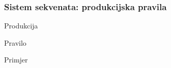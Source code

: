 \documentclass{beamer}
\begin{document}
\begin{frame}
  \frametitle{Sistem sekvenata: produkcijska pravila}
  \begin{block}{Produkcija}
    \begin{prooftree}
    \end{prooftree}
  \end{block}

  \begin{block}{Pravilo}
    \begin{scriptsize}
      \begin{prooftree}
      \end{prooftree}
    \end{scriptsize}
  \end{block}

  \begin{block}{Primjer}
    \begin{minipage}[t]{0.48\linewidth}
      \begin{prooftree}
      \end{prooftree}
    \end{minipage}
    \begin{minipage}[t]{0.48\linewidth}
      \begin{prooftree}
      \end{prooftree}
    \end{minipage}
  \end{block}
\end{frame}
\end{document}
